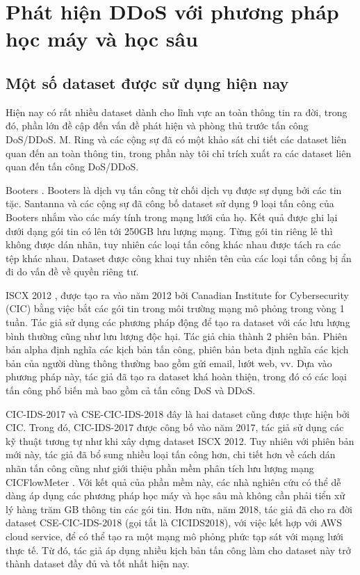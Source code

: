 \section{Phát hiện DDoS với phương pháp học máy và học sâu}

\subsection{Một số dataset được sử dụng hiện nay}

Hiện nay có rất nhiều dataset dành cho lĩnh vực an toàn thông tin ra đời, trong đó, phần lớn đề cập đến vấn đề phát hiện và phòng thủ trước tấn công DoS/DDoS. M. Ring và các cộng sự \cite{33-Ring} đã có một khảo sát chi tiết các dataset liên quan đến an toàn thông tin, trong phần này tôi chỉ trích xuất ra các dataset liên quan đến tấn công DoS/DDoS.

Booters \cite{34-Santanna}. Booters là dịch vụ tấn công từ chối dịch vụ được sự dụng bởi các tin tặc. Santanna và các cộng sự \cite{34-Santanna} đã công bố dataset sử dụng 9 loại tấn công của Booters nhắm vào các máy tính trong mạng lưới của họ. Kết quả được ghi lại dưới dạng gói tin có lên tới 250GB lưu lượng mạng. Từng gói tin riêng lẻ thì không được dán nhãn, tuy nhiên các loại tấn công khác nhau được tách ra các tệp khác nhau. Dataset được công khai tuy nhiên tên của các loại tấn công bị ẩn đi do vấn đề về quyền riêng tư.

ISCX 2012 \cite{35-Shiravi}, được tạo ra vào năm 2012 bởi Canadian Institute for Cybersecurity (CIC) bằng việc bắt các gói tin trong môi trường mạng mô phỏng trong vòng 1 tuần. Tác giả sử dụng các phương pháp động để tạo ra dataset với các lưu lượng bình thường cũng như lưu lượng độc hại. Tác giả chia thành 2 phiên bản. Phiên bản alpha định nghĩa các kịch bản tấn công, phiên bản beta định nghĩa các kịch bản của người dùng thông thường bao gồm gửi email, lướt web, vv. Dựa vào phương pháp này, tác giả đã tạo ra dataset khá hoàn thiện, trong đó có các loại tấn công phổ biến mà bao gồm cả tấn công DoS và DDoS.

CIC-IDS-2017 \cite{36-Sharafaldin} và CSE-CIC-IDS-2018 \cite{36a-ids2018} đây là hai dataset cũng được thực hiện bởi CIC. Trong đó, CIC-IDS-2017 được công bố vào năm 2017, tác giả sử dụng các kỹ thuật tương tự như khi xây dựng dataset ISCX 2012. Tuy nhiên với phiên bản mới này, tác giả đã bổ sung nhiều loại tấn công hơn, chi tiết hơn về cách dán nhãn tấn công cũng như giới thiệu phần mềm phân tích lưu lượng mạng CICFlowMeter \cite{37-cicflowmeter}. Với kết quả của phần mềm này, các nhà nghiên cứu có thể dễ dàng áp dụng các phương pháp học máy và học sâu mà không cần phải tiển xử lý hàng trăm GB thông tin các gói tin. Hơn nữa, năm 2018, tác giả đã cho ra đời dataset CSE-CIC-IDS-2018 (gọi tắt là CICIDS2018), với việc kết hợp với AWS cloud service, để có thể tạo ra một mạng mô phỏng phức tạp sát với mạng lưới thực tế. Từ đó, tác giả áp dụng nhiều kịch bản tấn công làm cho dataset này trở thành dataset đầy đủ và tốt nhất hiện nay.

